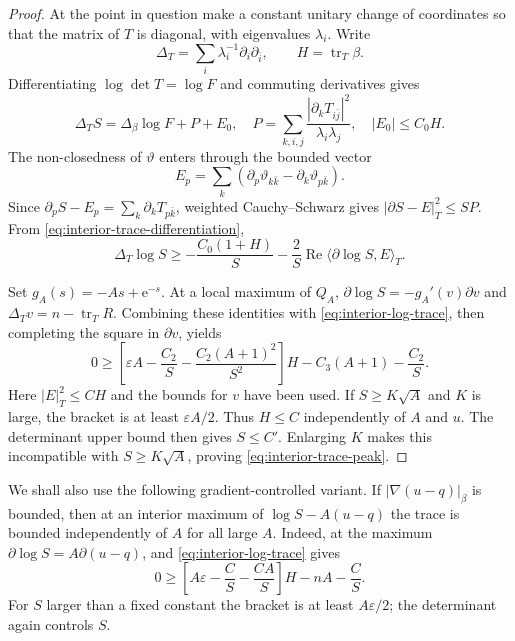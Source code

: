 \begin{proof}
At the point in question make a constant unitary change of coordinates so that the matrix of $T$ is diagonal, with eigenvalues $\lambda_i$. Write
\[
  \Delta_T=\sum_i\lambda_i^{-1}\partial_i\partial_{\bar i},
  \qquad H=\operatorname{tr}_T\beta.
\]
Differentiating $\log\det T=\log F$ and commuting derivatives gives
\begin{equation}\label{eq:interior-trace-differentiation}
  \Delta_TS=\Delta_\beta\log F+P+E_0,
  \quad
  P=\sum_{k,i,j}\frac{|\partial_kT_{i\bar j}|^2}{\lambda_i\lambda_j},
  \quad |E_0|\leq C_0H.
\end{equation}
The non-closedness of $\vartheta$ enters through the bounded vector
\[
  E_p=\sum_k(\partial_p\vartheta_{k\bar k}-\partial_k\vartheta_{p\bar k}).
\]
Since $\partial_pS-E_p=\sum_k\partial_kT_{p\bar k}$, weighted Cauchy--Schwarz gives $|\partial S-E|_T^2\leq SP$. From \eqref{eq:interior-trace-differentiation},
\begin{equation}\label{eq:interior-log-trace}
  \Delta_T\log S
  \geq-\frac{C_0(1+H)}S-
  \frac2S\operatorname{Re}\langle\partial\log S,E\rangle_T.
\end{equation}

Set $g_A(s)=-As+\mathrm{e}^{-s}$. At a local maximum of $Q_A$, $\partial\log S=-g_A'(v)\partial v$ and $\Delta_Tv=n-\operatorname{tr}_TR$. Combining these identities with \eqref{eq:interior-log-trace}, then completing the square in $\partial v$, yields
\begin{equation}\label{eq:interior-peak-inequality}
  0\geq
  \left[\varepsilon A-\frac{C_2}{S}-\frac{C_2(A+1)^2}{S^2}\right]H
  -C_3(A+1)-\frac{C_2}{S}.
\end{equation}
Here $|E|_T^2\leq CH$ and the bounds for $v$ have been used. If $S\geq K\sqrt A$ and $K$ is large, the bracket is at least $\varepsilon A/2$. Thus $H\leq C$ independently of $A$ and $u$. The determinant upper bound then gives $S\leq C'$. Enlarging $K$ makes this incompatible with $S\geq K\sqrt A$, proving \eqref{eq:interior-trace-peak}.
\end{proof}

We shall also use the following gradient-controlled variant. If $|\nabla(u-q)|_\beta$ is bounded, then at an interior maximum of $\log S-A(u-q)$ the trace is bounded independently of $A$ for all large $A$. Indeed, at the maximum $\partial\log S=A\partial(u-q)$, and \eqref{eq:interior-log-trace} gives
\[
  0\geq\left[A\varepsilon-\frac CS-\frac{CA}{S}\right]H-nA-\frac CS.
\]
For $S$ larger than a fixed constant the bracket is at least $A\varepsilon/2$; the determinant again controls $S$.

